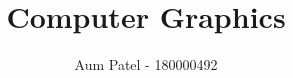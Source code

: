 \documentclass[10pt]{report}
\begin{document}
\author{Aum Patel - 180000492}
\title{Computer Graphics}
\maketitle


\tableofcontents

\chapter{}
\end{document}
